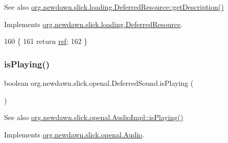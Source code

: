 \begin{DoxySeeAlso}{See also}
\mbox{\hyperlink{interfaceorg_1_1newdawn_1_1slick_1_1loading_1_1_deferred_resource_ab529c610c01ad0aaab6361c13010ba06}{org.\+newdawn.\+slick.\+loading.\+Deferred\+Resource\+::get\+Description()}} 
\end{DoxySeeAlso}


Implements \mbox{\hyperlink{interfaceorg_1_1newdawn_1_1slick_1_1loading_1_1_deferred_resource_ab529c610c01ad0aaab6361c13010ba06}{org.\+newdawn.\+slick.\+loading.\+Deferred\+Resource}}.


\begin{DoxyCode}
160                                    \{
161         \textcolor{keywordflow}{return} \mbox{\hyperlink{classorg_1_1newdawn_1_1slick_1_1openal_1_1_deferred_sound_adfed2acfb0cb1ef789edfc3102fa682c}{ref}};
162     \}
\end{DoxyCode}
\mbox{\label{classorg_1_1newdawn_1_1slick_1_1openal_1_1_deferred_sound_a165c465a5d0e1092cf2a6c1a0cf77e96}} 
\subsubsection{\texorpdfstring{is\+Playing()}{isPlaying()}}
{\footnotesize\ttfamily boolean org.\+newdawn.\+slick.\+openal.\+Deferred\+Sound.\+is\+Playing (\begin{DoxyParamCaption}{ }\end{DoxyParamCaption})\hspace{0.3cm}{\ttfamily [inline]}}

\begin{DoxySeeAlso}{See also}
\mbox{\hyperlink{classorg_1_1newdawn_1_1slick_1_1openal_1_1_audio_impl_a842212ec52d43824dee1d7c6e7fa4ce1}{org.\+newdawn.\+slick.\+openal.\+Audio\+Impl\+::is\+Playing()}} 
\end{DoxySeeAlso}


Implements \mbox{\hyperlink{interfaceorg_1_1newdawn_1_1slick_1_1openal_1_1_audio_a842b49128a58be8c4473cbcc8ee4ad9e}{org.\+newdawn.\+slick.\+openal.\+Audio}}.


